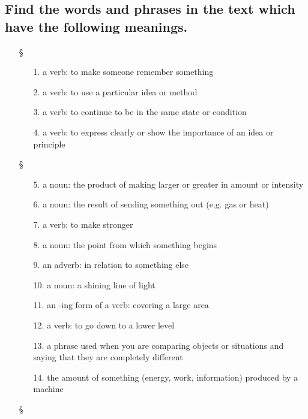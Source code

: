 \subsection*{Find the words and phrases in the text which have the following meanings.}
\begin{enumerate}
      \item[§] 
            \begin{enumerate}
                  \item[1.] a verb: to make someone remember something
                  \item[2.] a verb: to use a particular idea or method
                  \item[3.] a verb: to continue to be in the same state or condition
                  \item[4.] a verb: to express clearly or show the importance of an
                        idea or principle
            \end{enumerate}
      \item[§] 
            \begin{enumerate}
                  \item[5.] a noun: the product of making larger or greater in amount
                        or intensity
                  \item[6.] a noun: the result of sending something out (e.g. gas or
                        heat)
                  \item[7.] a verb: to make stronger
                  \item[8.] a noun: the point from which something begins
                  \item[9.] an adverb: in relation to something else
                  \item[10.] a noun: a shining line of light
                  \item[11.] an -ing form of a verb: covering a large area
                  \item[12.] a verb: to go down to a lower level
                  \item[13.] a phrase used when you are comparing objects or situations
                        and saying that they are completely different
                  \item[14.] the amount of something (energy, work, information)
                        produced by a machine
            \end{enumerate}
      \item[§] 

\end{enumerate}
